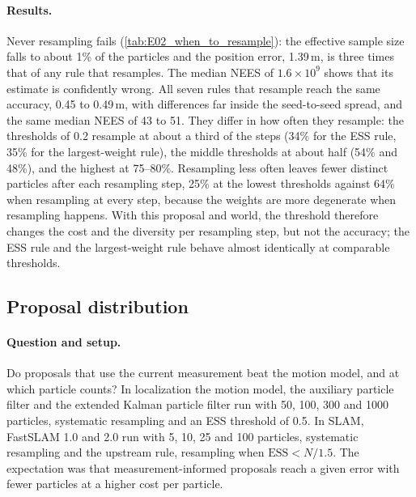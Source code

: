 \paragraph{Results.} Never resampling fails (\cref{tab:E02_when_to_resample}): the effective sample size falls to about
1\% of the particles and the position error, 1.39\,m, is three times that of any rule that resamples. The median NEES
of $1.6 \times 10^9$ shows that its estimate is confidently wrong. All seven rules that resample reach the same accuracy,
0.45 to 0.49\,m, with differences far inside the seed-to-seed spread, and the same median NEES of 43 to 51. They
differ in how often they resample: the thresholds of 0.2 resample at about a third of the steps (34\% for the ESS rule,
35\% for the largest-weight rule), the middle thresholds at about half (54\% and 48\%), and the highest at 75--80\%.
Resampling less often leaves fewer distinct particles after each resampling step, 25\% at the lowest thresholds against
64\% when resampling at every step, because the weights are more degenerate when resampling happens. With this proposal
and world, the threshold therefore changes the cost and the diversity per resampling step, but not the accuracy; the
ESS rule and the largest-weight rule behave almost identically at comparable thresholds.


\subsection{Proposal distribution}\label{sec:e03}

\paragraph{Question and setup.} Do proposals that use the current measurement beat the motion model, and at which
particle counts? In localization the motion model, the auxiliary particle filter and the extended Kalman particle filter
run with 50, 100, 300 and 1000 particles, systematic resampling and an ESS threshold of 0.5. In SLAM, FastSLAM 1.0 and
2.0 run with 5, 10, 25 and 100 particles, systematic resampling and the upstream rule, resampling when
$\mathrm{ESS} < N / 1.5$. The expectation was that measurement-informed proposals reach a given error with fewer
particles at a higher cost per particle.

